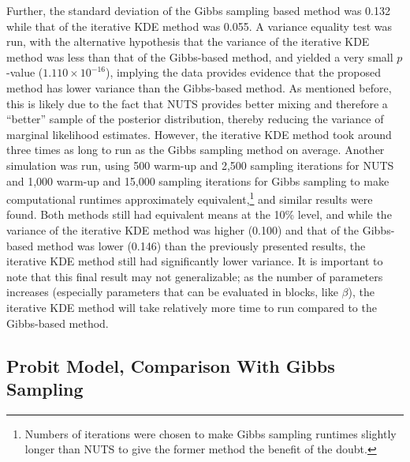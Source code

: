 \documentclass[twocolumn]{article}
\begin{document}
Further, the standard deviation of the Gibbs sampling based method was 0.132 while that of the iterative KDE method was 0.055. A variance equality test was run, with the alternative hypothesis that the variance of the iterative KDE method was less than that of the Gibbs-based method, and yielded a very small $p$-value ($1.110 \times 10^{-16}$), implying the data provides evidence that the proposed method has lower variance than the Gibbs-based method. As mentioned before, this is likely due to the fact that NUTS provides better mixing and therefore a ``better'' sample of the posterior distribution, thereby reducing the variance of marginal likelihood estimates. However, the iterative KDE method took around three times as long to run as the Gibbs sampling method on average. Another simulation was run, using 500 warm-up and 2,500 sampling iterations for NUTS and 1,000 warm-up and 15,000 sampling iterations for Gibbs sampling to make computational runtimes approximately equivalent,\footnote{Numbers of iterations were chosen to make Gibbs sampling runtimes slightly longer than NUTS to give the former method the benefit of the doubt.} and similar results were found. Both methods still had equivalent means at the 10\% level, and while the variance of the iterative KDE method was higher (0.100) and that of the Gibbs-based method was lower (0.146) than the previously presented results, the iterative KDE method still had significantly lower variance. It is important to note that this final result may not generalizable; as the number of parameters increases (especially parameters that can be evaluated in blocks, like $\beta$), the iterative KDE method will take relatively more time to run compared to the Gibbs-based method.

\subsection{Probit Model, Comparison With Gibbs Sampling}
\end{document}
